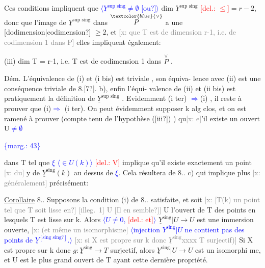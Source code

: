 \documentclass[11pt]{article}
\newcommand{\scanpage}[1]{\par\bigskip\noindent{\small\sffamily[scan #1]}\par}
\newcommand{\mspage}[1]{{\small\sffamily[p.\,#1]}}
\newcommand{\hand}[1]{\textcolor{blue}{#1}}
\let\over\relax
\newcommand{\over}[2]{\textcolor{gray}{#1}\textcolor{blue}{\ensuremath{^{\!\nearrow}}#2}}
\newcommand{\inserted}[2][]{\textcolor{blue}{$\langle$#2$\rangle$}}
\newcommand{\margin}[1]{\textcolor{blue}{\{\textsf{marg.:} #1\}}}
\newcommand{\deleted}[1]{\textcolor{red}{[\textsf{del.:} #1]}}
\newcommand{\xout}[1]{\textcolor{gray}{[\textsf{x:} #1]}}
\newcommand{\uline}[1]{\underline{#1}}
\newcommand{\unsure}[1]{[#1?]}
\newcommand{\illegible}[1]{[\textsf{illeg.\ #1}]}
\begin{document}
Ces conditions impliquent que \inserted{$\underline{Y}^{\text{sup sing}} \neq \emptyset$ \unsure{ou}} dim $\underline{Y}^{\text{sup sing}}$ \deleted{$\leq$}$= r-2$, donc que
l'image de $\underline{Y}^{\text{sup sing}}$ dans $\overset{\hand{\vee}}{P}$ a une \unsure{dodimension|codimension} $\geqslant 2$, et \xout{que T
est de dimension r-1, i.e. de codimension 1 dans P} elles impliquent
également:

(iii) dim T = r-1, i.e. T est de codimension 1 dans $\overset{\vee}{P}$ .

Dém. L'équivalence de (i) et (i bis) est triviale , son équiva-%
lence avec (ii) est une conséquence triviale de 8.\unsure{7}. b), enfin l'équi-%
valence de (ii) et (ii bis) est pratiquement la définition de
$\underline{Y}^{\text{sup sing}}$ . Evidemment (i ter) \hand{$\Longrightarrow$}(i) , il reste à prouver que (i)\hand{$\Longrightarrow$}
(i ter). On peut évidemment supposer k alg clos, et on est ramené à
prouver (compte tenu de l'hypothèse (\unsure{iii}) ) qu\xout{e}'il existe un ouvert U\hand{$\neq\emptyset$}

\margin{43}

\clearpage
\scanpage{25/44}
\mspage{\hand{40}}

dans T tel que \hand{$\xi$} \inserted{$\in U(k)$} \deleted{V} implique qu'il existe exactement  un point \xout{du} y de
$\underline{Y}^{\text{sing}}(k)$ au dessus de \hand{$\xi$}. Cela résultera de 8.\over{\unsure{6}}{7}. c) qui implique plus
\xout{généralement} précisément:

\uline{Corollaire} 8.\over{\unsure{8}}{9}.  Supposons la condition (i) de 8.\over{\unsure{7}}{8}. satisfaite, et
soit  \xout{\unsure{T(k) un point tel que T soit lisse en} \illegible{1} U \unsure{Il en semble}}
U l'ouvert de T des points en lesquels T est lisse sur k. Alors \inserted{$U\neq 0$, \deleted{et}}
$\underline{Y}^{\text{sing}}|U \longrightarrow U$ est une immersion ouverte, \xout{(et même un isomorphisme} \inserted{injection $Y^{\text{sing}}|U$ ne contient pas des points de $\underline{Y}^{\unsure{\text{sing sing}}}$.}
\xout{si X est propre sur k donc $\underline{Y}^{\text{sing}}$xxxx T surjectif)} Si X est propre sur
k donc $g:\underline{Y}^{\text{sing}}\longrightarrow T$ surjectif, alors $\underline{Y}^{\text{sing}}|U\longrightarrow U$ est un isomorphi
me, et U est le plus grand ouvert de T ayant cette dernière propriété.
\end{document}

